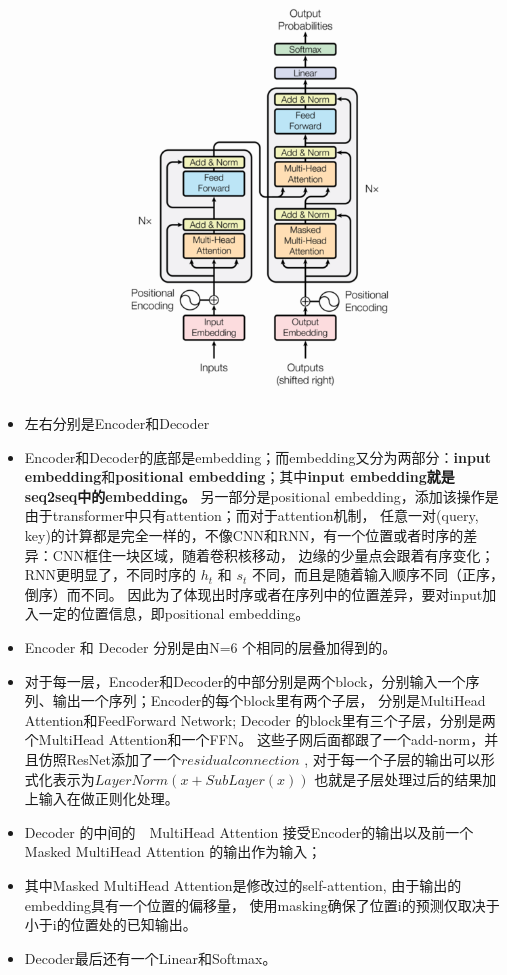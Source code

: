 \documentclass[UTF8,a4paper,10pt]{ctexart}
\begin{document}
\begin{figure}
\centering
\includegraphics[scale=0.6]{pics/190417-arch.png}
\end{figure}

\begin{itemize}
  \item  左右分别是Encoder和Decoder
  \item Encoder和Decoder的底部是embedding；而embedding又分为两部分：\textbf{input embedding}和\textbf{positional embedding}；其中\textbf{input embedding就是seq2seq中的embedding。}
    另一部分是positional embedding，添加该操作是由于transformer中只有attention；而对于attention机制，
    任意一对(query, key)的计算都是完全一样的，不像CNN和RNN，有一个位置或者时序的差异：CNN框住一块区域，随着卷积核移动，
    边缘的少量点会跟着有序变化；RNN更明显了，不同时序的 $h_t$ 和 $s_t$ 不同，而且是随着输入顺序不同（正序，倒序）而不同。
    因此为了体现出时序或者在序列中的位置差异，要对input加入一定的位置信息，即positional embedding。
  \item Encoder 和 Decoder 分别是由N=6 个相同的层叠加得到的。
  \item 对于每一层，Encoder和Decoder的中部分别是两个block，分别输入一个序列、输出一个序列；Encoder的每个block里有两个子层，
    分别是MultiHead Attention和FeedForward Network; Decoder 的block里有三个子层，分别是两个MultiHead Attention和一个FFN。
    这些子网后面都跟了一个add-norm，并且仿照ResNet添加了一个$residual connection$ ,
    对于每一个子层的输出可以形式化表示为$LayerNorm(x + SubLayer(x))$ 也就是子层处理过后的结果加上输入在做正则化处理。
  \item Decoder 的中间的　MultiHead Attention 接受Encoder的输出以及前一个Masked MultiHead Attention 的输出作为输入；
  \item 其中Masked MultiHead Attention是修改过的self-attention, 由于输出的embedding具有一个位置的偏移量，
    使用masking确保了位置i的预测仅取决于小于i的位置处的已知输出。
  \item Decoder最后还有一个Linear和Softmax。
\end{itemize}
\end{document}
